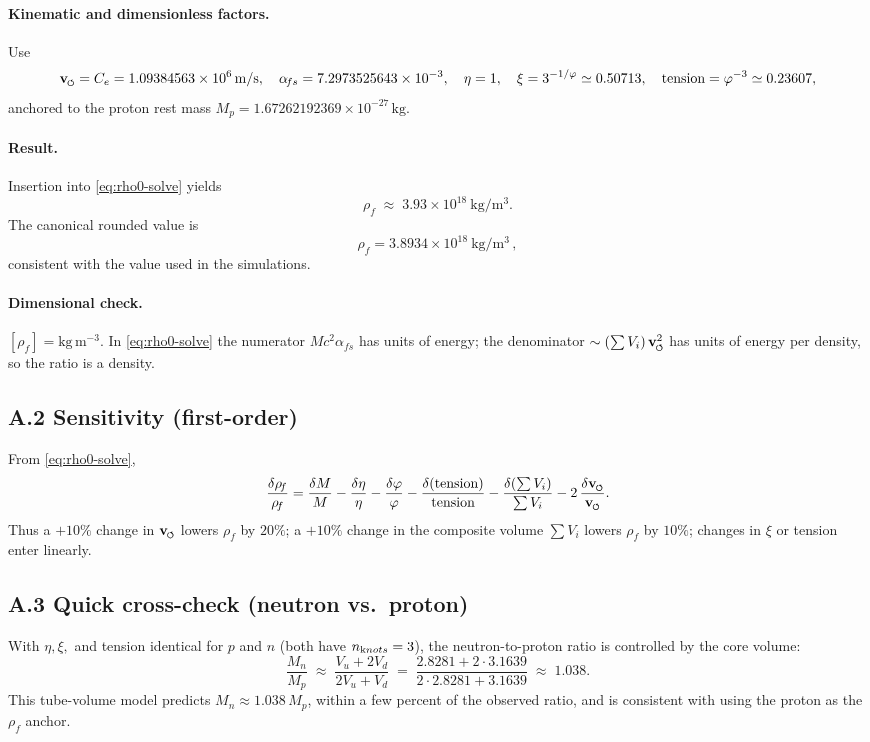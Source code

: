 \documentclass[smallextended]{svjour3}       %
\newcommand{\swirlarrow}{%
	\mathchoice{\mkern-2mu\scriptstyle\boldsymbol{\circlearrowleft}}%
	{\mkern-2mu\scriptstyle\boldsymbol{\circlearrowleft}}%
	{\mkern-2mu\scriptscriptstyle\boldsymbol{\circlearrowleft}}%
	{\mkern-2mu\scriptscriptstyle\boldsymbol{\circlearrowleft}}%
}
\newcommand{\vswirl}{\mathbf{v}_{\swirlarrow}}
\newcommand{\rhoF}{\rho_{\!f}}      %
\begin{document}
	\paragraph{Kinematic and dimensionless factors.}
	Use
	\[
		\vswirl = C_e = 1.09384563\times10^6\,\mathrm{m/s},\quad
		\alpha_{\!fs}=7.2973525643\times10^{-3},\quad
		\eta=1,\quad \xi = 3^{-1/\varphi}\simeq 0.50713,\quad
		\text{tension} = \varphi^{-3} \simeq 0.23607,
	\]
	anchored to the proton rest mass \(M_p=1.67262192369\times10^{-27}\,\mathrm{kg}\).

	\paragraph{Result.}
	Insertion into \eqref{eq:rho0-solve} yields
	\[
		\rhoF \;\approx\; 3.93\times 10^{18}\ \mathrm{kg/m^3}.
	\]
	The canonical rounded value is
	\[
		\boxed{ \rhoF = 3.8934\times 10^{18}\ \mathrm{kg/m^3} }\,,
	\]
	consistent with the value used in the simulations.

	\paragraph{Dimensional check.}
	\([\rhoF]=\mathrm{kg\,m^{-3}}\).
	In \eqref{eq:rho0-solve} the numerator \(M c^2\alpha_{\!fs}\) has units of energy; the denominator
	\(\sim (\sum V_i)\,\vswirl^{2}\) has units of energy per density, so the ratio is a density.

	\subsection*{A.2 Sensitivity (first-order)}
	From \eqref{eq:rho0-solve},
	\[
		\frac{\delta\rhoF}{\rhoF}
		= \frac{\delta M}{M}
		- \frac{\delta\eta}{\eta}
		- \frac{\delta\varphi}{\varphi}
		- \frac{\delta(\text{tension})}{\text{tension}}
		- \frac{\delta(\sum V_i)}{\sum V_i}
		- 2\,\frac{\delta \vswirl}{\vswirl}.
	\]
	Thus a \(+10\%\) change in \(\vswirl\) lowers \(\rhoF\) by \(20\%\); a \(+10\%\) change in the composite volume \(\sum V_i\) lowers \(\rhoF\) by \(10\%\); changes in \(\xi\) or tension enter linearly.

	\subsection*{A.3 Quick cross-check (neutron vs.\ proton)}
	With \(\eta,\xi,\) and tension identical for \(p\) and \(n\) (both have \(n_{\textrm knots}=3\)),
	the neutron-to-proton ratio is controlled by the core volume:
	\[
		\frac{M_n}{M_p}\;\approx\;\frac{V_u + 2V_d}{2V_u + V_d}
		\;=\; \frac{2.8281 + 2\cdot 3.1639}{2\cdot 2.8281 + 3.1639}
		\;\approx\; 1.038.
	\]
	This tube-volume model predicts \(M_n \approx 1.038\,M_p\), within a few percent of the observed ratio, and is consistent with using the proton as the \(\rhoF\) anchor.
\end{document}
